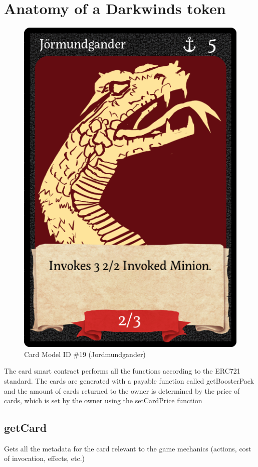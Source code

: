 \documentclass[11pt,twocolumn]{article}
\begin{document}
\section{Anatomy of a Darkwinds token}
\begin{figure}[!htb]
\centering 
\includegraphics[scale=0.3]{wp/card} 

\caption{Card Model ID \#19 (Jordmundgander)} \label{fig:A}
\end{figure}


The card smart contract performs all the functions according to the ERC721 \cite{nft} standard. The cards are generated with a payable function called getBoosterPack and the amount of cards returned to the owner is determined by the price of cards, which is set by the owner using the setCardPrice function
\subsection{getCard}
Gets all the metadata for the card relevant to the game mechanics (actions, cost of invocation, effects, etc.)
\end{document}
